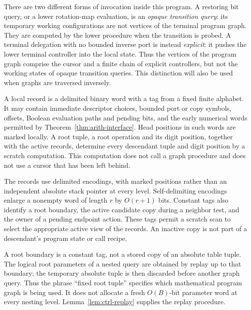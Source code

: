 There are two different forms of invocation inside this program.  A
restoring bit query, or a lower rotation-map evaluation, is an \emph{opaque
transition query}: its temporary working configurations are not vertices
of the terminal program graph.  They are computed by the lower
procedure when the transition is probed.  A terminal delegation with no
bounded inverse port is instead \emph{explicit}: it pushes the lower
terminal controller into the local state.  Thus the vertices of the
program graph comprise the cursor and a finite chain of explicit
controllers, but not the working states of opaque transition queries.
This distinction will also be used when graphs are traversed inversely.

\begin{definition}\label{def:ctrl-record}
A local record is a delimited binary word with a tag from a fixed finite
alphabet.  It may contain immediate descriptor choices, bounded port or
copy symbols, offsets, Boolean evaluation paths and pending bits, and the
early numerical words permitted by Theorem~\ref{thm:arith-interface}.
Head positions in such words are marked locally.  A root tuple, a root
operation and its digit position, together with the active records,
determine every descendant tuple and digit position by a scratch computation.
This computation does not call a graph procedure and does not use a
cursor that has been left behind.  
\end{definition}

The records use delimited encodings, with marked positions rather than
an independent absolute stack pointer at every level.  Self-delimiting
encodings enlarge a nonempty word of length $r$ by $O(r+1)$ bits.
Constant tags also identify a root boundary, the active candidate copy
during a neighbor test, and the owner of a pending endpoint action.
These tags permit a scratch scan to select the appropriate active view
of the records.  An inactive copy is not part of a descendant's program
state or call recipe.

A root boundary is a constant tag, not a stored copy of an absolute
table tuple.  The logical root parameters of a nested query are obtained
by replay up to that boundary; the temporary absolute tuple is then
discarded before another graph query.  Thus the phrase ``fixed root
tuple'' specifies which mathematical program graph is being used.  It
does not allocate a fresh $O(B)$-bit parameter word at every nesting
level.  Lemma~\ref{lem:ctrl-replay} supplies the replay procedure.

